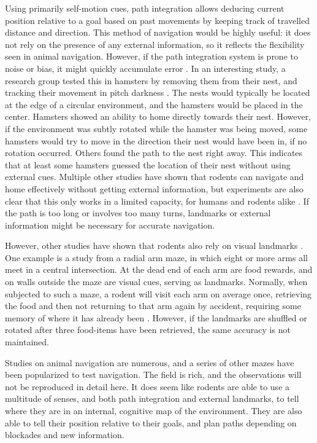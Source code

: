 \documentclass{article}
\begin{document}
    Using primarily self-motion cues, path integration allows deducing current position relative to a goal based on past movements by keeping track of travelled distance and direction. This method of navigation would be highly useful: it does not rely on the presence of any external information, so it reflects the flexibility seen in animal navigation. However, if the path integration system is prone to noise or bias, it might quickly accumulate error \parencite{Cheung2007}. In an interesting study, a research group tested this in hamsters by removing them from their nest, and tracking their movement in pitch darkness \parencite{Etienne1986}. The nests would typically be located at the edge of a circular environment, and the hamsters would be placed in the center. Hamsters showed an ability to home directly towards their nest. However, if the environment was subtly rotated while the hamster was being moved, some hamsters would try to move in the direction their nest would have been in, if no rotation occurred. Others found the path to the nest right away. This indicates that at least some hamsters guessed the location of their nest without using external cues. Multiple other studies have shown that rodents can navigate and home effectively without getting external information, but experiments are also clear that this only works in a limited capacity, for humans and rodents alike \parencite{Kim2013}. If the path is too long or involves too many turns, landmarks or external information might be necessary for accurate navigation.

    However, other studies have shown that rodents also rely on visual landmarks \parencite{Dudchenko2010}. One example is a study from a radial arm maze, in which eight or more arms all meet in a central intersection. At the dead end of each arm are food rewards, and on walls outside the maze are visual cues, serving as landmarks. Normally, when subjected to such a maze, a rodent will visit each arm on average once, retrieving the food and then not returning to that arm again by accident, requiring some memory of where it has already been \parencite{Suzuki1980}. However, if the landmarks are shuffled or rotated after three food-items have been retrieved, the same accuracy is not maintained.

    Studies on animal navigation are numerous, and a series of other mazes have been popularized to test navigation. The field is rich, and the observations will not be reproduced in detail here. It does seem like rodents are able to use a multitude of senses, and both path integration and external landmarks, to tell where they are in an internal, cognitive map of the environment. They are also able to tell their position relative to their goals, and plan paths depending on blockades and new information.
    
\end{document}
